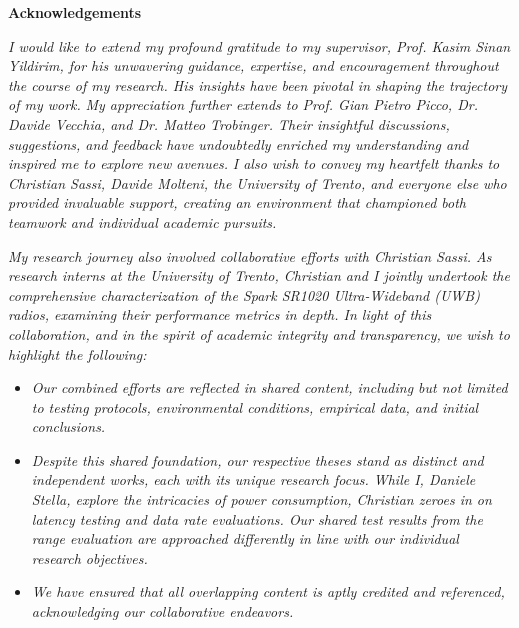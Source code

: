 \thispagestyle{empty}

\begin{center}
  {\bf \Huge Acknowledgements}
\end{center}

\vspace{4cm}


\emph{
I would like to extend my profound gratitude to my supervisor, Prof. Kasim Sinan Yildirim, for his unwavering guidance, expertise, and encouragement throughout the course of my research. His insights have been pivotal in shaping the trajectory of my work.}
\emph{My appreciation further extends to Prof. Gian Pietro Picco, Dr. Davide Vecchia, and Dr. Matteo Trobinger. Their insightful discussions, suggestions, and feedback have undoubtedly enriched my understanding and inspired me to explore new avenues.}
\emph{I also wish to convey my heartfelt thanks to Christian Sassi, Davide Molteni, the University of Trento, and everyone else who provided invaluable support, creating an environment that championed both teamwork and individual academic pursuits.}

\emph{My research journey also involved collaborative efforts with Christian Sassi. As research interns at the University of Trento, Christian and I jointly undertook the comprehensive characterization of the Spark SR1020 Ultra-Wideband (UWB) radios, examining their performance metrics in depth. In light of this collaboration, and in the spirit of academic integrity and transparency, we wish to highlight the following:
}
\begin{itemize}
    \item \textit{Our combined efforts are reflected in shared content, including but not limited to testing protocols, environmental conditions, empirical data, and initial conclusions.}
    \item \textit{Despite this shared foundation, our respective theses stand as distinct and independent works, each with its unique research focus. While I, Daniele Stella, explore the intricacies of power consumption, Christian zeroes in on latency testing and data rate evaluations. Our shared test results from the range evaluation are approached differently in line with our individual research objectives.}
    \item \textit{We have ensured that all overlapping content is aptly credited and referenced, acknowledging our collaborative endeavors.}
\end{itemize}

